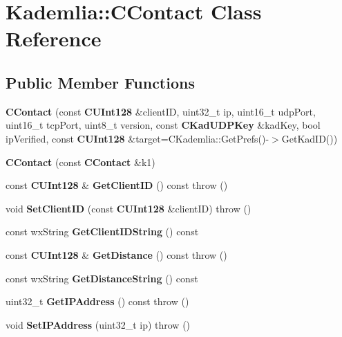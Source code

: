 \section{Kademlia::CContact Class Reference}
\label{classKademlia_1_1CContact}
\subsection*{Public Member Functions}
\begin{DoxyCompactItemize}
\item 
{\bfseries CContact} (const {\bf CUInt128} \&clientID, uint32\_\-t ip, uint16\_\-t udpPort, uint16\_\-t tcpPort, uint8\_\-t version, const {\bf CKadUDPKey} \&kadKey, bool ipVerified, const {\bf CUInt128} \&target=CKademlia::GetPrefs()-\/$>$GetKadID())\label{classKademlia_1_1CContact_ab288a5af8a19a5244f88fee89e1e7334}

\item 
{\bfseries CContact} (const {\bf CContact} \&k1)\label{classKademlia_1_1CContact_a4721f0dd11460af463695f48b6bfa896}

\item 
const {\bf CUInt128} \& {\bfseries GetClientID} () const   throw ()\label{classKademlia_1_1CContact_a632fd8a8873def2ae249cb2f08eb4126}

\item 
void {\bfseries SetClientID} (const {\bf CUInt128} \&clientID)  throw ()\label{classKademlia_1_1CContact_a27a6ed109fd48087bf287d34ac2f74d5}

\item 
const wxString {\bfseries GetClientIDString} () const \label{classKademlia_1_1CContact_a628731006602e630181825e172afca27}

\item 
const {\bf CUInt128} \& {\bfseries GetDistance} () const   throw ()\label{classKademlia_1_1CContact_aca65f7539dcc097396b966716200f719}

\item 
const wxString {\bfseries GetDistanceString} () const \label{classKademlia_1_1CContact_abc580720501d1490e4d53a7f463f13a3}

\item 
uint32\_\-t {\bfseries GetIPAddress} () const   throw ()\label{classKademlia_1_1CContact_a007ee30eb18472e9dd18a9f8e87f5229}

\item 
void {\bfseries SetIPAddress} (uint32\_\-t ip)  throw ()\label{classKademlia_1_1CContact_abd3da6c29749490a8db6ba7484514ffa}


\end{DoxyCompactItemize}
